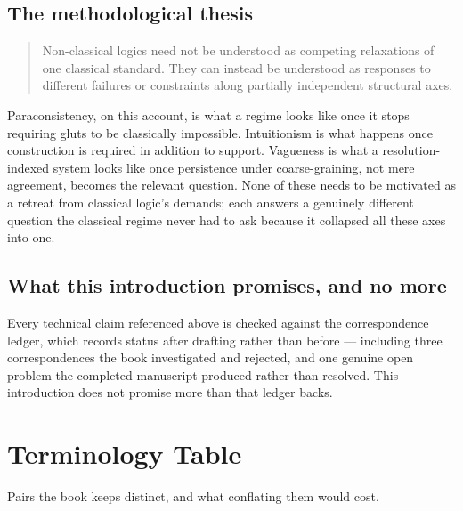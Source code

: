 \hypertarget{the-methodological-thesis}{%
\section{The methodological thesis}\label{the-methodological-thesis}}

\begin{quote}
Non-classical logics need not be understood as competing relaxations of
one classical standard. They can instead be understood as responses to
different failures or constraints along partially independent
structural axes.
\end{quote}

Paraconsistency, on this account, is what a regime looks like once it
stops requiring gluts to be classically impossible. Intuitionism is what
happens once construction is required in addition to support. Vagueness
is what a resolution-indexed system looks like once persistence under
coarse-graining, not mere agreement, becomes the relevant question. None
of these needs to be motivated as a retreat from classical logic's
demands; each answers a genuinely different question the classical
regime never had to ask because it collapsed all these axes into one.

\hypertarget{what-this-introduction-promises-and-no-more}{%
\section{What this introduction promises, and no more}\label{what-this-introduction-promises-and-no-more}}

Every technical claim referenced above is checked against the
correspondence ledger, which records status after drafting rather than
before --- including three correspondences the book investigated and
rejected, and one genuine open problem the completed manuscript produced
rather than resolved. This introduction does not promise more than that
ledger backs.

\hypertarget{terminology-table}{%
\chapter*{Terminology Table}
\label{terminology-table}}

Pairs the book keeps distinct, and what conflating them would cost.

